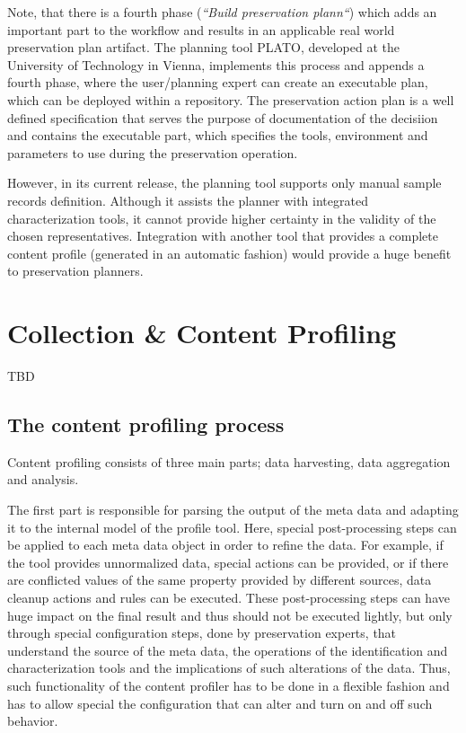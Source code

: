 Note, that there is a fourth phase (\textit{``Build preservation plann``}) which adds an important part to the workflow and results in an applicable real world preservation plan artifact. The planning tool PLATO, developed at the University of Technology in Vienna, implements this process and appends a fourth phase, where the user/planning expert can create an executable plan, which can be deployed within a repository. The preservation action plan is a well defined specification that serves the purpose of documentation of the decisiion and contains the executable part, which specifies the tools, environment and parameters to use during the preservation operation.

However, in its current release, the planning tool supports only manual sample records definition. Although it assists the planner with integrated characterization tools, it cannot provide higher certainty in the validity of the chosen representatives. Integration with another tool that provides a complete content profile (generated in an automatic fashion) would provide a huge benefit to preservation planners.

\section{Collection \& Content Profiling}
TBD
\subsection{The content profiling process}
Content profiling consists of three main parts; data harvesting, data aggregation and analysis.

The first part is responsible for parsing the output of the meta data and adapting it to the internal model of the profile tool. Here, special post-processing steps can be applied to each meta data object in order to refine the data. For example, if the tool provides unnormalized data, special actions can be provided, or if there are conflicted values of the same property provided by different sources, data cleanup actions and rules can be executed. These post-processing steps can have huge impact on the final result and thus should not be executed lightly, but only through special configuration steps, done by preservation experts, that understand the source of the meta data, the operations of the identification and characterization tools and the implications of such alterations of the data. Thus, such functionality of the content profiler has to be done in a flexible fashion and has to allow special the configuration that can alter and turn on and off such behavior.

